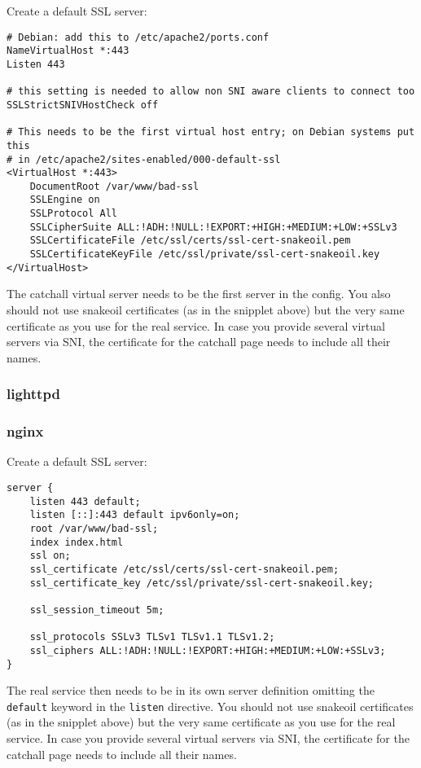 Create a default SSL server:

\begin{lstlisting}
# Debian: add this to /etc/apache2/ports.conf
NameVirtualHost *:443
Listen 443

# this setting is needed to allow non SNI aware clients to connect too
SSLStrictSNIVHostCheck off

# This needs to be the first virtual host entry; on Debian systems put this
# in /etc/apache2/sites-enabled/000-default-ssl
<VirtualHost *:443>
    DocumentRoot /var/www/bad-ssl
    SSLEngine on
    SSLProtocol All
    SSLCipherSuite ALL:!ADH:!NULL:!EXPORT:+HIGH:+MEDIUM:+LOW:+SSLv3
    SSLCertificateFile /etc/ssl/certs/ssl-cert-snakeoil.pem
    SSLCertificateKeyFile /etc/ssl/private/ssl-cert-snakeoil.key
</VirtualHost>
\end{lstlisting}

The catchall virtual server needs to be the first server in the config.
You also should not use snakeoil certificates (as in the snipplet above)
but the very same certificate as you use for the real service. In case you
provide several virtual servers via SNI, the certificate for the catchall page
needs to include all their names.

\subsubsection{lighttpd}


\subsubsection{nginx}

Create a default SSL server:

\begin{lstlisting}
server {
    listen 443 default;
    listen [::]:443 default ipv6only=on;
    root /var/www/bad-ssl;
    index index.html
    ssl on;
    ssl_certificate /etc/ssl/certs/ssl-cert-snakeoil.pem;
    ssl_certificate_key /etc/ssl/private/ssl-cert-snakeoil.key;

    ssl_session_timeout 5m;

    ssl_protocols SSLv3 TLSv1 TLSv1.1 TLSv1.2;
    ssl_ciphers ALL:!ADH:!NULL:!EXPORT:+HIGH:+MEDIUM:+LOW:+SSLv3;
}
\end{lstlisting}

The real service then needs to be in its own server definition omitting the
\texttt{default} keyword in the \texttt{listen} directive.
You should not use snakeoil certificates (as in the snipplet above) but the
very same certificate as you use for the real service. In case you provide
several virtual servers via SNI, the certificate for the catchall page needs
to include all their names.

